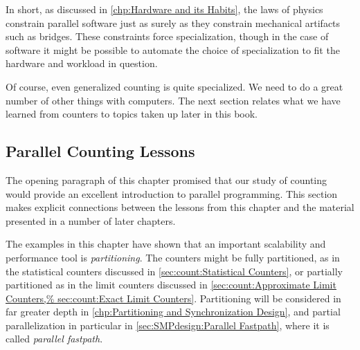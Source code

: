 In short, as discussed in
\cref{chp:Hardware and its Habits},
the laws of physics constrain parallel software just as surely as they
constrain mechanical artifacts such as bridges.
These constraints force specialization, though in the case of software
it might be possible to automate the choice of specialization to
fit the hardware and workload in question.

Of course, even generalized counting is quite specialized.
We need to do a great number of other things with computers.
The next section relates what we have learned from counters to
topics taken up later in this book.

\subsection{Parallel Counting Lessons}
\label{sec:count:Parallel Counting Lessons}

The opening paragraph of this chapter promised that our study of counting
would provide an excellent introduction to parallel programming.
This section makes explicit connections between the lessons from
this chapter and the material presented in a number of later chapters.

The examples in this chapter have shown that an important scalability
and performance tool is \emph{partitioning}.
The counters might be fully partitioned, as in the statistical counters
discussed in \cref{sec:count:Statistical Counters},
or partially partitioned as in the limit counters discussed in
\cref{sec:count:Approximate Limit Counters,%
sec:count:Exact Limit Counters}.
Partitioning will be considered in far greater depth in
\cref{chp:Partitioning and Synchronization Design},
and partial parallelization in particular in
\cref{sec:SMPdesign:Parallel Fastpath}, where it is called
\emph{parallel fastpath}.

